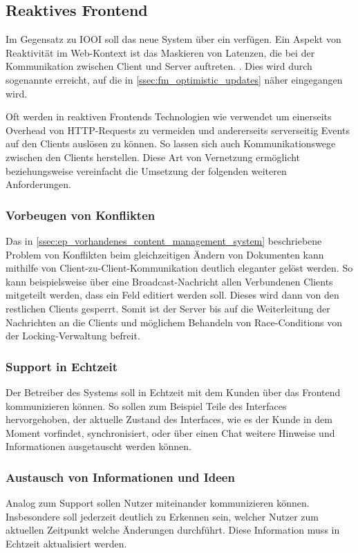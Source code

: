 \subsection{Reaktives Frontend}
\label{ssec:ea_reaktives_frontend}

Im Gegensatz zu IOOI soll das neue System über ein  verfügen.  Ein Aspekt von Reaktivität im Web-Kontext ist das Maskieren
von Latenzen, die bei der Kommunikation zwischen Client und Server auftreten.
\cite{reactive-frontends}.  Dies wird durch sogenannte  erreicht, auf die in \cref{ssec:fm_optimistic_updates} näher
eingegangen wird.

Oft werden in reaktiven Frontends Technologien wie 
\cite{RFC6455} verwendet um einerseits Overhead von HTTP-Requests zu vermeiden
und andererseits serverseitig Events auf den Clients auslösen zu können.  So
lassen sich auch Kommunikationswege zwischen den Clients herstellen.  Diese Art
von Vernetzung ermöglicht beziehungsweise vereinfacht die Umsetzung der
folgenden weiteren Anforderungen.

\subsubsection{Vorbeugen von Konflikten}
\label{sssec:ear_vorbeugen_von_konflikten}

Das in \cref{ssec:ep_vorhandenes_content_management_system} beschriebene Problem
von Konflikten beim gleichzeitigen Ändern von Dokumenten kann mithilfe von
Client-zu-Client-Kommunikation deutlich eleganter gelöst werden.  So kann
beispielsweise über eine Broadcast-Nachricht allen Verbundenen Clients
mitgeteilt werden, dass ein Feld editiert werden soll.  Dieses wird dann von den
restlichen Clients gesperrt.  Somit ist der Server bis auf die Weiterleitung der
Nachrichten an die Clients und möglichem Behandeln von Race-Conditions von der
Locking-Verwaltung befreit.

\subsubsection{Support in Echtzeit}
\label{sssec:ear_support_in_echtzeit}

Der Betreiber des Systems soll in Echtzeit mit dem Kunden über das Frontend
kommunizieren können.  So sollen zum Beispiel Teile des Interfaces
hervorgehoben, der aktuelle Zustand des Interfaces, wie es der Kunde in dem
Moment vorfindet, synchronisiert, oder über einen Chat weitere Hinweise und
Informationen ausgetauscht werden können.

\subsubsection{Austausch von Informationen und Ideen}
\label{sssec:ear_austausch_von_informationen_und_ideen}

Analog zum Support sollen Nutzer miteinander kommunizieren können.  Insbesondere
soll jederzeit deutlich zu Erkennen sein, welcher Nutzer zum aktuellen Zeitpunkt
welche Änderungen durchführt.  Diese Information muss in Echtzeit aktualisiert
werden.
